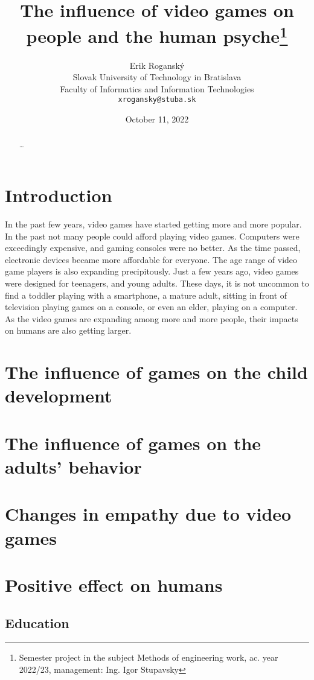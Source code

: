 \documentclass[10pt,twoside,english,a4paper]{article}
\title{The influence of video games on people and the human psyche\thanks{Semester project in the subject Methods of engineering work, ac. year 2022/23, management: Ing. Igor Stupavsky}}
\author{Erik Roganský\\[2pt]
	{\small Slovak University of Technology in Bratislava}\\
	{\small Faculty of Informatics and Information Technologies}\\
	{\small \texttt{xrogansky@stuba.sk}}
	}
\date{\small October 11, 2022}
\begin{document}
\maketitle

\begin{abstract}
\ldots
\end{abstract}



\section{Introduction}

In the past few years, video games have started getting more and more popular. In the past not many people could afford playing video games. Computers were exceedingly expensive, and gaming consoles were no better. As the time passed, electronic devices became more affordable for everyone. The age range of video game players is also expanding precipitously. Just a few years ago, video games were designed for teenagers, and young adults. These days, it is not uncommon to find a toddler playing with a smartphone, a mature adult, sitting in front of television playing games on a console, or even an elder, playing on a computer. As the video games are expanding among more and more people, their impacts on humans are also getting larger.  

\section{The influence of games on the child development} \label{part1}


\section{The influence of games on the adults' behavior} \label{part2}


\section{Changes in empathy due to video games} \label{part3}


\section{Positive effect on humans} \label{part3}
\subsection{Education}
\end{document}
